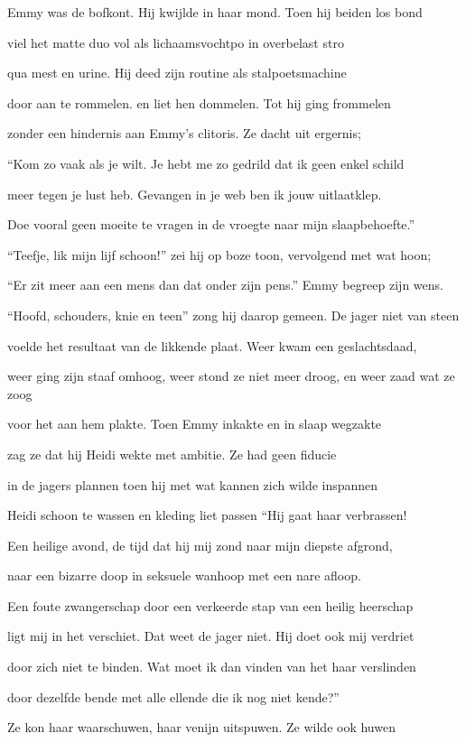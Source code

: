 Emmy was de bofkont.
Hij kwijlde in haar mond.
Toen hij beiden los bond

viel het matte duo
vol als lichaamsvochtpo
in overbelast stro

qua mest en urine.
Hij deed zijn routine
als stalpoetsmachine

door aan te rommelen.
en liet hen dommelen.
Tot hij ging frommelen

zonder een hindernis
aan Emmy’s clitoris.
Ze dacht uit ergernis;

“Kom zo vaak als je wilt.
Je hebt me zo gedrild
dat ik geen enkel schild

meer tegen je lust heb.
Gevangen in je web
ben ik jouw uitlaatklep.

Doe vooral geen moeite
te vragen in de vroegte
naar mijn slaapbehoefte.”

“Teefje, lik mijn lijf schoon!”
zei hij op boze toon,
vervolgend met wat hoon;

“Er zit meer aan een mens
dan dat onder zijn pens.”
Emmy begreep zijn wens.

“Hoofd, schouders, knie en teen”
zong hij daarop gemeen.
De jager niet van steen

voelde het resultaat
van de likkende plaat.
Weer kwam een geslachtsdaad,

weer ging zijn staaf omhoog,
weer stond ze niet meer droog,
en weer zaad wat ze zoog

voor het aan hem plakte.
Toen Emmy inkakte
en in slaap wegzakte

zag ze dat hij Heidi
wekte met ambitie.
Ze had geen fiducie

in de jagers plannen
toen hij met wat kannen
zich wilde inspannen

Heidi schoon te wassen
en kleding liet passen
“Hij gaat haar verbrassen!

Een heilige avond,
de tijd dat hij mij zond
naar mijn diepste afgrond,

naar een bizarre doop
in seksuele wanhoop
met een nare afloop.

Een foute zwangerschap
door een verkeerde stap
van een heilig heerschap

ligt mij in het verschiet.
Dat weet de jager niet.
Hij doet ook mij verdriet

door zich niet te binden.
Wat moet ik dan vinden
van het haar verslinden

door dezelfde bende
met alle ellende
die ik nog niet kende?”

Ze kon haar waarschuwen,
haar venijn uitspuwen.
Ze wilde ook huwen

